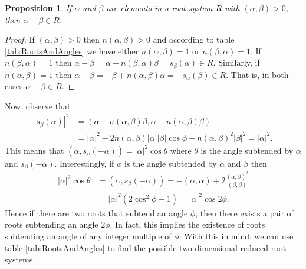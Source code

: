 \documentclass[twoside,utf8]{article}
\theoremstyle{plain}
\newtheorem{proposition}{Proposition}
\theoremstyle{definition}
\theoremstyle{remark}
\begin{document}
\begin{proposition} \label{prop:AlphaBetaDiffInR}
If $\alpha$ and $\beta$ are elements in a root system $R$ with $(\alpha,\beta)>0$, then $\alpha-\beta \in R$.
\end{proposition}
\begin{proof}
If $(\alpha,\beta)>0$ then $n(\alpha,\beta)>0$ and according to table \ref*{tab:RootsAndAngles} we have either $n(\alpha,\beta)=1$ or $n(\beta,\alpha)=1$. If $n(\beta,\alpha)=1$ then $\alpha-\beta = \alpha-n(\beta,\alpha)\beta =  s_\beta(\alpha) \in R$. Similarly, if $n(\alpha,\beta)=1$ then $\alpha-\beta = -\beta+n(\alpha,\beta)\alpha=-s_{\alpha}(\beta)\in R$. That is, in both cases $\alpha-\beta \in R$.
\end{proof}

\noindent
Now, observe that
\[
\begin{aligned}
|s_\beta(\alpha)|^2 
&= \left(\alpha-n(\alpha,\beta)\beta,\alpha-n(\alpha,\beta)\beta\right) \\
&= |\alpha|^2-2n(\alpha,\beta)|\alpha||\beta|\cos \phi+n(\alpha,\beta)^2|\beta|^2 = |\alpha|^2.
\end{aligned}
\]
This means that $(\alpha,s_\beta(-\alpha))=|\alpha|^2 \cos \theta$ where $\theta$ is the angle subtended by $\alpha$ and $s_\beta(-\alpha)$. Interestingly, if $\phi$ is the angle subtended by $\alpha$ and $\beta$ then
\[
\begin{aligned}
|\alpha|^2 \cos \theta 
&= (\alpha,s_\beta(-\alpha))
= -(\alpha,\alpha)+2\frac{(\alpha,\beta)^2}{(\beta,\beta)} \\
&= |\alpha|^2 \left( 2\cos^2 \phi - 1 \right)
= |\alpha|^2 \cos 2\phi.
\end{aligned}
\]
Hence if there are two roots that subtend an angle $\phi$, then there exists a pair of roots subtending an angle $2\phi$. In fact, this implies the existence of roots subtending an angle of any integer multiple of $\phi$.
 With this in mind, we can use table \ref*{tab:RootsAndAngles} to find the possible two dimensional reduced root systems.
\end{document}
